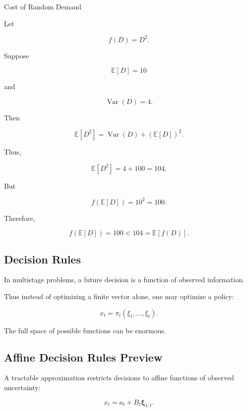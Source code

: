 \begin{workedexamplebox}{Cost of Random Demand}

Let

\[
f(D)=D^2.
\]

Suppose

\[
\mathbb{E}[D]=10
\]

and

\[
\operatorname{Var}(D)=4.
\]

Then

\[
\mathbb{E}[D^2]
=
\operatorname{Var}(D)
+
(\mathbb{E}[D])^2.
\]

Thus,

\[
\mathbb{E}[D^2]
=
4+100
=
104.
\]

But

\[
f(\mathbb{E}[D])
=
10^2
=
100.
\]

Therefore,

\begin{answerbox}
\[
\boxed{
f(\mathbb{E}[D])
=
100
<
104
=
\mathbb{E}[f(D)].
}
\]
\end{answerbox}

\end{workedexamplebox}

\subsection{Decision Rules}
\label{subsec:stochastic-decision-rules}

In multistage problems, a future decision is a function of observed
information.

Thus instead of optimizing a finite vector alone, one may optimize a
policy:

\[
\boxed{
x_t
=
\pi_t
(
\xi_1,\ldots,\xi_t
).
}
\]

The full space of possible functions can be enormous.

\subsection{Affine Decision Rules Preview}
\label{subsec:affine-decision-rules}

A tractable approximation restricts decisions to affine functions of
observed uncertainty:

\[
\boxed{
x_t
=
a_t
+
B_t
\boldsymbol{\xi}_{1:t}.
}
\]

